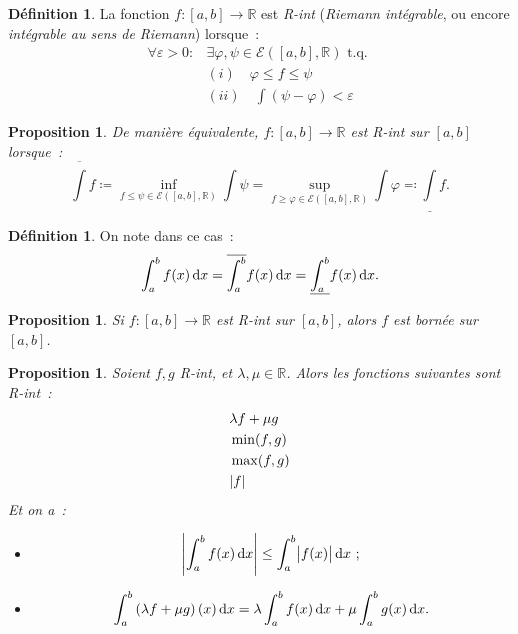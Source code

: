 \documentclass{report}
\newtheorem{prp}[thm]{Proposition}
\theoremstyle{definition}
\newtheorem{déf}[thm]{Définition}
\theoremstyle{remark}
\newcommand{\R}{\mathbb R}
\newcommand{\tq}{\text{ t.q. }}
\newcommand{\El}[2]{\mathcal E\!\left(#1, #2\right)}
\begin{document}
			\begin{déf} La fonction $f : [a, b] \to \R$ est \textit{R-int} (\textit{Riemann intégrable}, ou encore \textit{intégrable au sens de Riemann})
			lorsque~:
			\begin{align*}
				\forall \varepsilon > 0 : &\exists \varphi, \psi \in \El {[a, b]}\R \tq \\
				&(i) \quad \varphi \leq f \leq \psi \\
				&(ii) \quad \int(\psi-\varphi) < \varepsilon
			\end{align*}
			\end{déf}

			\begin{prp} De manière équivalente, $f : [a, b] \to \R$ est R-int sur $[a, b]$ lorsque~:
			\[\overline \int f \coloneqq \inf_{f \leq \psi \in \El {[a, b]}\R}\int \psi
				= \sup_{f \geq \varphi \in \El {[a, b]}\R}\int \varphi \eqqcolon \underline \int f.\]
			\end{prp}

			\begin{déf} On note dans ce cas~:
			\[\int_a^b f(x)\dif x = \overline {\int_a^b} f(x)\dif x = \underline {\int_a^b} f(x)\dif x.\]
			\end{déf}

			\begin{prp} Si $f : [a, b] \to \R$ est R-int sur $[a, b]$, alors $f$ est bornée sur $[a, b]$.
			\end{prp}

			\begin{prp} Soient $f, g$ R-int, et $\lambda, \mu \in \R$. Alors les fonctions suivantes sont R-int~:
			\begin{align*}
				&\lambda f + \mu g \\
				&\min(f, g) \\
				&\max(f, g) \\
				&\abs f
			\end{align*}
			Et on a~:
			\begin{itemize}
				\item[$(i)$]  \[\abs {\int_a^b f(x)\dif x} \leq \int_a^b\abs {f(x)}\dif x~;\]
				\item[$(ii)$] \[\int_a^b\left(\lambda f + \mu g\right)(x)\dif x = \lambda \int_a^b f(x)\dif x + \mu \int_a^b g(x)\dif x.\]
			\end{itemize}
			\end{prp}
\end{document}
